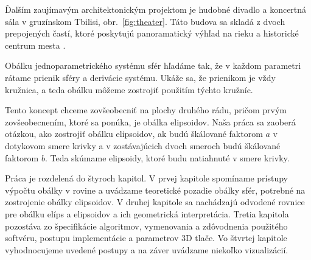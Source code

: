 
Ďalším zaujímavým architektonickým projektom je hudobné divadlo a koncertná sála v gruzínskom Tbilisi, obr.~\ref{fig:theater}. Táto budova sa skladá z dvoch prepojených častí, ktoré poskytujú panoramatický výhľad na rieku a historické centrum mesta \cite{Mesz18}.

Obálku jednoparametrického systému sfér hľadáme tak, že v každom parametri rátame prienik sféry a derivácie systému. Ukáže sa, že prienikom je vždy kružnica, a teda obálku môžeme zostrojiť použitím týchto kružníc. 

Tento koncept chceme zovšeobecniť na plochy druhého rádu, pričom prvým zovšeobecnením, ktoré sa ponúka, je obálka elipsoidov. Naša práca sa zaoberá otázkou, ako zostrojiť obálku elipsoidov, ak budú škálované faktorom $a$ v dotykovom smere krivky a v zostávajúcich dvoch smeroch budú škálované faktorom $b$. Teda skúmame elipsoidy, ktoré budu natiahnuté v smere krivky.

Práca je rozdelená do štyroch kapitol. V prvej kapitole spomíname prístupy výpočtu obálky v rovine a uvádzame teoretické pozadie obálky sfér, potrebné na zostrojenie obálky elipsoidov. V druhej kapitole sa nachádzajú odvodené rovnice pre obálku elíps a elipsoidov a ich geometrická interpretácia. Tretia kapitola pozostáva zo špecifikácie algoritmov, vymenovania a zdôvodnenia použitého softvéru, postupu implementácie a parametrov 3D tlače. Vo štvrtej kapitole vyhodnocujeme uvedené postupy a na záver uvádzame niekoľko vizualizácií.